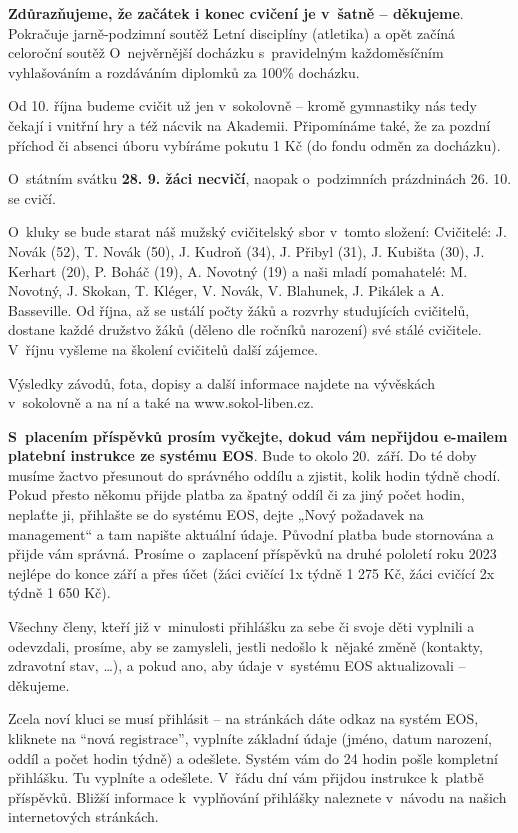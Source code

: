 \documentclass[11pt]{article}
\begin{document}
\textbf{Zdůrazňujeme, že začátek i konec cvičení je v~šatně – děkujeme}. Pokračuje jarně-podzimní soutěž Letní disciplíny (atletika) a opět začíná celoroční soutěž O~nejvěrnější docházku s~pravidelným každoměsíčním vyhlašováním a rozdáváním diplomků za 100\% docházku.

Od 10. října budeme cvičit už jen v~sokolovně – kromě gymnastiky nás tedy čekají i vnitřní hry a též nácvik na Akademii. Připomínáme také, že za pozdní příchod či absenci úboru vybíráme pokutu 1 Kč (do fondu odměn za docházku). 

O~státním svátku \textbf{28. 9. žáci necvičí}, naopak o~podzimních prázdninách 26. 10. se cvičí.

O~kluky se bude starat náš mužský cvičitelský sbor v~tomto složení: Cvičitelé: J. Novák (52), T. Novák (50), J. Kudroň (34), J. Přibyl (31), J. Kubišta (30), J. Kerhart (20), P. Boháč (19), A. Novotný (19) a naši mladí pomahatelé: M. Novotný, J. Skokan, T. Kléger, V. Novák, V. Blahunek, J. Pikálek a A. Basseville. Od října, až se ustálí počty žáků a rozvrhy studujících cvičitelů, dostane každé družstvo žáků (děleno dle ročníků narození) své stálé cvičitele. V~říjnu vyšleme na školení cvičitelů další zájemce.

Výsledky závodů, fota, dopisy a další informace najdete na vývěskách v~sokolovně a na ní a také na www.sokol-liben.cz.

\textbf{S~placením příspěvků prosím vyčkejte, dokud vám nepřijdou e-mailem platební instrukce ze systému EOS}. Bude to okolo 20.~září. Do té doby musíme žactvo přesunout do správného oddílu a zjistit, kolik hodin týdně chodí. Pokud přesto někomu přijde platba za špatný oddíl či za jiný počet hodin, neplaťte ji, přihlašte se do systému EOS, dejte „Nový požadavek na management“ a tam napište aktuální údaje. Původní platba bude stornována a přijde vám správná. Prosíme o~zaplacení příspěvků na druhé pololetí roku 2023 nejlépe do konce září a přes účet (žáci cvičící 1x týdně 1 275 Kč, žáci cvičící 2x týdně 1 650 Kč). 

Všechny členy, kteří již v~minulosti přihlášku za sebe či svoje děti vyplnili a odevzdali, prosíme, aby se zamysleli, jestli nedošlo k~nějaké změně (kontakty, zdravotní stav, …), a pokud ano, aby údaje v~systému EOS aktualizovali – děkujeme.

Zcela noví kluci se musí přihlásit – na stránkách dáte odkaz na systém EOS, kliknete na “nová registrace”, vyplníte základní údaje (jméno, datum narození, oddíl a počet hodin týdně) a odešlete. Systém vám do 24 hodin pošle kompletní přihlášku. Tu vyplníte a odešlete. V~řádu dní vám přijdou instrukce k~platbě příspěvků. Bližší informace k~vyplňování přihlášky naleznete v~návodu na našich internetových stránkách. 
\end{document}

